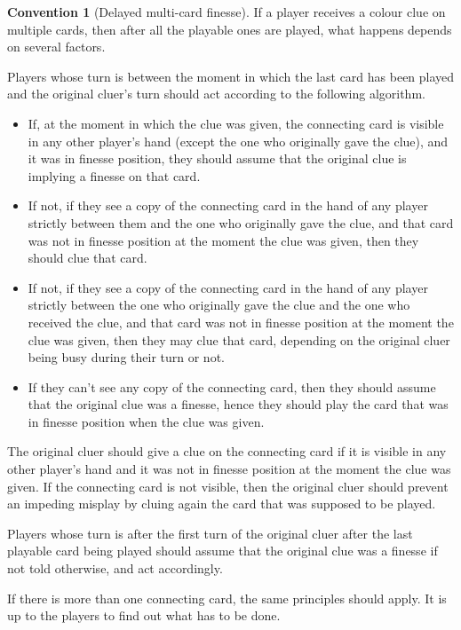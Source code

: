 \documentclass[a4paper]{article}
\theoremstyle{plain}
\theoremstyle{definition}
\newtheorem{convention}[theorem]{Convention}
\begin{document}
\begin{convention}[Delayed multi-card finesse]
	If a player receives a colour clue on multiple cards, then after all the playable ones are played, what happens depends on several factors.
	
	Players whose turn is between the moment in which the last card has been played and the original cluer's turn should act according to the following algorithm.
	
	\begin{itemize}
		\item If, at the moment in which the clue was given, the connecting card is visible in any other player's hand (except the one who originally gave the clue), and it was in finesse position, they should assume that the original clue is implying a finesse on that card.
		\item If not, if they see a copy of the connecting card in the hand of any player strictly between them and the one who originally gave the clue, and that card was not in finesse position at the moment the clue was given, then they should clue that card.
		\item If not, if they see a copy of the connecting card in the hand of any player strictly between the one who originally gave the clue and the one who received the clue, and that card was not in finesse position at the moment the clue was given, then they may clue that card, depending on the original cluer being busy during their turn or not.
		\item If they can't see any copy of the connecting card, then they should assume that the original clue was a finesse, hence they should play the card that was in finesse position when the clue was given.
	\end{itemize}

	The original cluer should give a clue on the connecting card if it is visible in any other player's hand and it was not in finesse position at the moment the clue was given. If the connecting card is not visible, then the original cluer should prevent an impeding misplay by cluing again the card that was supposed to be played.
	
	Players whose turn is after the first turn of the original cluer after the last playable card being played should assume that the original clue was a finesse if not told otherwise, and act accordingly.
	
	If there is more than one connecting card, the same principles should apply. It is up to the players to find out what has to be done.
\end{convention}
\end{document}
